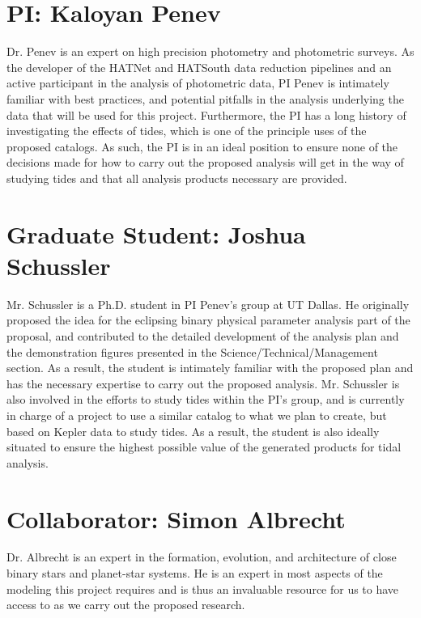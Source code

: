 \section*{}

\vspace{5mm}

\section*{PI: Kaloyan Penev}

Dr. Penev is an expert on high precision photometry and photometric surveys. As
the developer of the HATNet and HATSouth data reduction pipelines and an active
participant in the analysis of photometric data, PI Penev is intimately familiar
with best practices, and potential pitfalls in the analysis underlying the data
that will be used for this project. Furthermore, the PI has a long history of
investigating the effects of tides, which is one of the principle uses of the
proposed catalogs. As such, the PI is in an ideal position to ensure none of
the decisions made for how to carry out the proposed analysis will get in the
way of studying tides and that all analysis products necessary are provided.

\vspace{5mm}

\section*{Graduate Student: Joshua Schussler}

Mr. Schussler is a Ph.D. student in PI Penev's group at UT Dallas. He originally
proposed the idea for the eclipsing binary physical parameter analysis part of
the proposal, and contributed to the detailed development of the analysis plan
and the demonstration figures presented in the Science/Technical/Management
section. As a result, the student is intimately familiar with the proposed plan
and has the necessary expertise to carry out the proposed analysis. Mr.
Schussler is also involved in the efforts to study tides within the PI's group,
and is currently in charge of a project to use a similar catalog to what we plan
to create, but based on Kepler data to study tides. As a result, the student is
also ideally situated to ensure the highest possible value of the generated
products for tidal analysis.

\vspace{5mm}

\section*{Collaborator: Simon Albrecht}

Dr. Albrecht is an expert in the formation, evolution, and architecture of close
binary stars and planet-star systems. He is an expert in most aspects of the
modeling this project requires and is thus an invaluable resource for us to have
access to as we carry out the proposed research.
